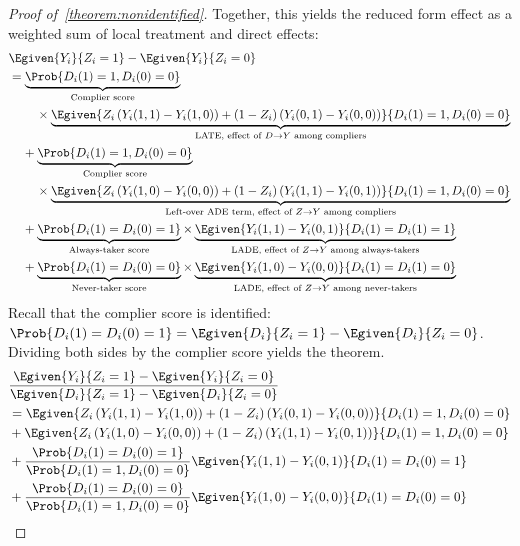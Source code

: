 \begin{proof}[Proof of~\autoref{theorem:nonidentified}]
    Together, this yields the reduced form effect as a weighted sum of local treatment and direct effects: 
    \begin{align*}
        &\Egiven{Y_i}{Z_i = 1} - \Egiven{Y_i}{Z_i = 0} \\
        &= 
        \underbrace{\Prob{D_i(1) = 1, D_i(0) = 0}}_{\text{Complier score}} \\
        & \;\;\;\; \;\;\;\; \times
        \underbrace{\Egiven{ Z_i \left(Y_i(1, 1) - Y_i(1, 0) \right)
            + (1 - Z_i) \left(Y_i(0, 1) - Y_i(0, 0) \right) }{
                D_i(1) = 1, D_i(0) = 0}}_{
                    \text{LATE, effect of } D \to Y \text{ among compliers}} \\
        & \;\;\;\; +
        \underbrace{\Prob{D_i(1) = 1, D_i(0) = 0}}_{\text{Complier score}} \\
        & \;\;\;\; \;\;\;\; \times
        \underbrace{\Egiven{Z_i \left(Y_i(1, 0) - Y_i(0, 0) \right)
            + (1 - Z_i) \left(Y_i(1, 1) - Y_i(0, 1) \right)}{
                D_i(1) = 1, D_i(0) = 0}}_{
                    \text{Left-over ADE term, effect of } Z \to Y \text{ among compliers}} \\
        & \;\;\;\; + 
        \underbrace{\Prob{D_i(1) = D_i(0) = 1}}_{\text{Always-taker score}}
        \times
        \underbrace{\Egiven{Y_i(1,1) - Y_i(0,1)}{D_i(1) = D_i(1) = 1}}_{
                \text{LADE, effect of } Z \to Y \text{ among always-takers}
            } \\
        & \;\;\;\; + \underbrace{\Prob{D_i(1) = D_i(0) = 0}}_{\text{Never-taker score}}
        \times
        \underbrace{\Egiven{Y_i(1,0) - Y_i(0,0)}{D_i(1) = D_i(1) = 0}}_{
                \text{LADE, effect of } Z \to Y \text{ among never-takers}
            }
    \end{align*}
    Recall that the complier score is identified: $\Prob{D_i(1) = D_i(0) = 1} = \Egiven{D_i}{Z_i = 1} - \Egiven{D_i}{Z_i = 0}$.
    Dividing both sides by the complier score yields the theorem.
    \begin{align*}
        &\frac{ \Egiven{Y_i}{Z_i = 1} - \Egiven{Y_i}{Z_i = 0}}{
            \Egiven{D_i}{Z_i = 1} - \Egiven{D_i}{Z_i = 0}} \\
        &= \Egiven{ Z_i \left(Y_i(1, 1) - Y_i(1, 0) \right)
            + (1 - Z_i) \left(Y_i(0, 1) - Y_i(0, 0) \right)}{
                D_i(1) = 1, D_i(0) = 0} \\
        &+ \Egiven{ Z_i \left(Y_i(1, 0) - Y_i(0, 0) \right)
            + (1 - Z_i) \left(Y_i(1, 1) - Y_i(0, 1) \right)}{
                D_i(1) = 1, D_i(0) = 0} \\
        &+ \frac{\Prob{D_i(1) = D_i(0) = 1}}{\Prob{D_i(1) = 1, D_i(0) = 0}}
            \Egiven{Y_i(1,1) - Y_i(0,1)}{D_i(1) = D_i(0) = 1} \\
        &+ \frac{\Prob{D_i(1) = D_i(0) = 0}}{\Prob{D_i(1) = 1, D_i(0) = 0}}
            \Egiven{Y_i(1,0) - Y_i(0,0)}{D_i(1) = D_i(0) = 0}
    \end{align*}
\end{proof}

